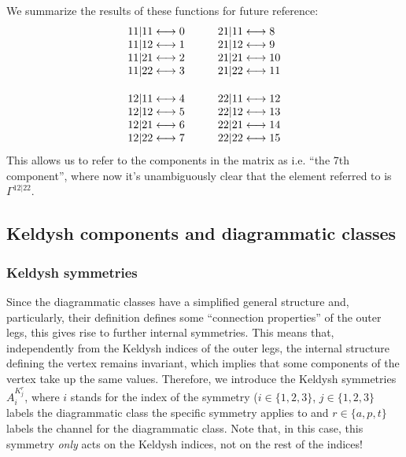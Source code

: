 \documentclass[12pt,a4paper,roman]{article}
\begin{document}
We summarize the results of these functions for future reference:
\begin{align}
    \begin{array}{r@{\mskip\thickmuskip}l}
    11|11 &\longleftrightarrow 0 \\
    11|12 &\longleftrightarrow 1 \\
    11|21 &\longleftrightarrow 2 \\
    11|22 &\longleftrightarrow 3 \\
    \vspace{0.05cm}\\
    12|11 &\longleftrightarrow 4 \\
    12|12 &\longleftrightarrow 5 \\
    12|21 &\longleftrightarrow 6 \\
    12|22 &\longleftrightarrow 7
    \end{array} 
  \quad  \quad
  \begin{array}{l@{\mskip\thickmuskip}l}
    21|11 &\longleftrightarrow 8 \\
    21|12 &\longleftrightarrow 9 \\
    21|21 &\longleftrightarrow 10 \\
    21|22 &\longleftrightarrow 11 \\
    \vspace{0.05cm}\\
    22|11 &\longleftrightarrow 12 \\
    22|12 &\longleftrightarrow 13 \\
    22|21 &\longleftrightarrow 14 \\
    22|22 &\longleftrightarrow 15
  \end{array}
\end{align}
This allows us to refer to the components in the matrix as i.e. ``the 7th component'', where now it's unambiguously clear that the element referred to is $\Gamma^{12|22}$.


\subsection*{Keldysh components and diagrammatic classes}
\subsubsection*{Keldysh symmetries}
Since the diagrammatic classes have a simplified general structure and, particularly, their definition defines some ``connection properties'' of the outer legs, this gives rise to further internal symmetries. This means that, independently from the Keldysh indices of the outer legs, the internal structure defining the vertex remains invariant, which implies that some components of the vertex take up the same values.
Therefore, we introduce the Keldysh symmetries $A_i^{K^r_j}$, where $i$ stands for the index of the symmetry ($i \in \{1,2,3\}$, $j\in\{1,2,3\}$ labels the diagrammatic class the specific symmetry applies to and $r\in\{a, p, t\}$ labels the channel for the diagrammatic class. Note that, in this case, this symmetry \textit{only} acts on the Keldysh indices, not on the rest of the indices!
\end{document}
